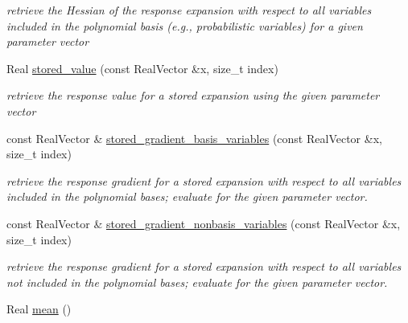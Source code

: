 \begin{DoxyCompactItemize}
\begin{DoxyCompactList}\small\item\em retrieve the Hessian of the response expansion with respect to all variables included in the polynomial basis (e.\+g., probabilistic variables) for a given parameter vector \end{DoxyCompactList}\item 
Real \hyperlink{classPecos_1_1HierarchInterpPolyApproximation_a1abe918dbdc66ac0fde85f1ab3c061af}{stored\+\_\+value} (const Real\+Vector \&x, size\+\_\+t index)\label{classPecos_1_1HierarchInterpPolyApproximation_a1abe918dbdc66ac0fde85f1ab3c061af}

\begin{DoxyCompactList}\small\item\em retrieve the response value for a stored expansion using the given parameter vector \end{DoxyCompactList}\item 
const Real\+Vector \& \hyperlink{classPecos_1_1HierarchInterpPolyApproximation_a7689fc058e2efdde6ce4dfe898864592}{stored\+\_\+gradient\+\_\+basis\+\_\+variables} (const Real\+Vector \&x, size\+\_\+t index)\label{classPecos_1_1HierarchInterpPolyApproximation_a7689fc058e2efdde6ce4dfe898864592}

\begin{DoxyCompactList}\small\item\em retrieve the response gradient for a stored expansion with respect to all variables included in the polynomial bases; evaluate for the given parameter vector. \end{DoxyCompactList}\item 
const Real\+Vector \& \hyperlink{classPecos_1_1HierarchInterpPolyApproximation_af0c9184d9a0da7b0e3d0d3ecbfc8f434}{stored\+\_\+gradient\+\_\+nonbasis\+\_\+variables} (const Real\+Vector \&x, size\+\_\+t index)\label{classPecos_1_1HierarchInterpPolyApproximation_af0c9184d9a0da7b0e3d0d3ecbfc8f434}

\begin{DoxyCompactList}\small\item\em retrieve the response gradient for a stored expansion with respect to all variables not included in the polynomial bases; evaluate for the given parameter vector. \end{DoxyCompactList}\item 
Real \hyperlink{classPecos_1_1HierarchInterpPolyApproximation_adc6f262952d05a33ff68cae37929cbb2}{mean} ()\label{classPecos_1_1HierarchInterpPolyApproximation_adc6f262952d05a33ff68cae37929cbb2}


\end{DoxyCompactItemize}
